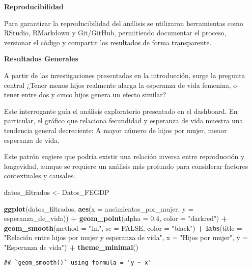 \documentclass[
]{article}
\newenvironment{Shaded}{\begin{snugshade}}{\end{snugshade}}
\newcommand{\AttributeTok}[1]{\textcolor[rgb]{0.13,0.29,0.53}{#1}}
\newcommand{\ConstantTok}[1]{\textcolor[rgb]{0.56,0.35,0.01}{#1}}
\newcommand{\FloatTok}[1]{\textcolor[rgb]{0.00,0.00,0.81}{#1}}
\newcommand{\FunctionTok}[1]{\textcolor[rgb]{0.13,0.29,0.53}{\textbf{#1}}}
\newcommand{\NormalTok}[1]{#1}
\newcommand{\OtherTok}[1]{\textcolor[rgb]{0.56,0.35,0.01}{#1}}
\newcommand{\SpecialCharTok}[1]{\textcolor[rgb]{0.81,0.36,0.00}{\textbf{#1}}}
\newcommand{\StringTok}[1]{\textcolor[rgb]{0.31,0.60,0.02}{#1}}
\begin{document}
\textbf{Reproducibilidad}

Para garantizar la reproducibilidad del análisis se utilizaron
herramientas como RStudio, RMarkdown y Git/GitHub, permitiendo
documentar el proceso, versionar el código y compartir los resultados de
forma transparente.

\textbf{Resultados Generales}

A partir de las investigaciones presentadas en la introducción, surge la
pregunta central ¿Tener menos hijos realmente alarga la esperanza de
vida femenina, o tener entre dos y cinco hijos genera un efecto similar?

Este interrogante guía el análisis exploratorio presentado en el
dashboard. En particular, el gráfico que relaciona fecundidad y
esperanza de vida muestra una tendencia general decreciente: A mayor
número de hijos por mujer, menor esperanza de vida.

Este patrón sugiere que podría existir una relación inversa entre
reproducción y longevidad, aunque se requiere un análisis más profundo
para considerar factores contextuales y causales.

\begin{Shaded}
\begin{Highlighting}[]
\NormalTok{datos\_filtrados }\OtherTok{\textless{}{-}}\NormalTok{ Datos\_FEGDP}
  
\FunctionTok{ggplot}\NormalTok{(datos\_filtrados, }\FunctionTok{aes}\NormalTok{(}\AttributeTok{x =}\NormalTok{ nacimientos\_por\_mujer, }\AttributeTok{y =}\NormalTok{ esperanza\_de\_vida)) }\SpecialCharTok{+}
  \FunctionTok{geom\_point}\NormalTok{(}\AttributeTok{alpha =} \FloatTok{0.4}\NormalTok{, }\AttributeTok{color =} \StringTok{"darkred"}\NormalTok{) }\SpecialCharTok{+}
  \FunctionTok{geom\_smooth}\NormalTok{(}\AttributeTok{method =} \StringTok{"lm"}\NormalTok{, }\AttributeTok{se =} \ConstantTok{FALSE}\NormalTok{, }\AttributeTok{color =} \StringTok{"black"}\NormalTok{) }\SpecialCharTok{+}
  \FunctionTok{labs}\NormalTok{(}\AttributeTok{title =} \StringTok{"Relación entre hijos por mujer }
\StringTok{       y esperanza de vida"}\NormalTok{, }\AttributeTok{x =} \StringTok{"Hijos por mujer"}\NormalTok{, }\AttributeTok{y =} \StringTok{"Esperanza de vida"}\NormalTok{) }\SpecialCharTok{+}
  \FunctionTok{theme\_minimal}\NormalTok{()}
\end{Highlighting}
\end{Shaded}

\begin{verbatim}
## `geom_smooth()` using formula = 'y ~ x'
\end{verbatim}
\end{document}
